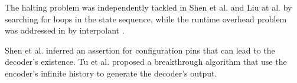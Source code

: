 \documentclass[twocolumn]{article}
\makeatletter
\def\subsection{\@startsection {subsection}{2}{\z@}{16pt plus 2pt minus 2pt}
{6pt plus 2pt minus 2pt}{\normalsize\sl
\edef\@svsec{\thesubsection.\ }}}
\def\thesubsection{\Alph{subsection}}
\makeatother
\begin{document}
The halting problem was independently tackled in Shen et al.\cite{ShenTCAD11} and Liu at al.\cite{LiuICCAD11} by searching for loops in the state sequence,
while the runtime overhead problem was addressed in \cite{ShenTCAD12,LiuICCAD11} by interpolant \cite{InterpBoolFunction}.

Shen et al. \cite{ShenTCAD12} inferred an assertion for configuration pins
that can lead to the decoder's existence.
Tu et al.\cite{TuDAC13} proposed a breakthrough algorithm that 
use the encoder's infinite history to generate the decoder's output.

% 
% 
% 
\end{document}
